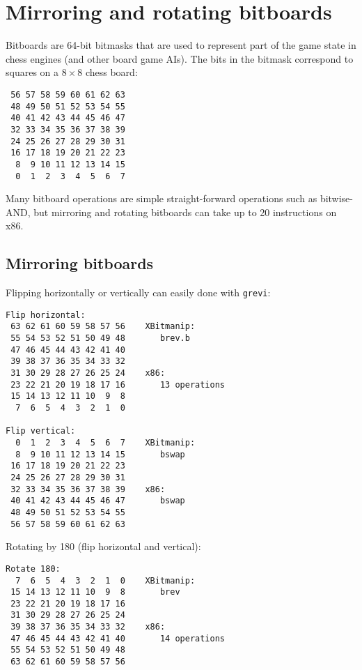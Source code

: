\section{Mirroring and rotating bitboards}

Bitboards are 64-bit bitmasks that are used to represent part of the game state
in chess engines (and other board game AIs). The bits in the bitmask correspond
to squares on a $8 \times 8$ chess board:

\begin{verbatim}
 56 57 58 59 60 61 62 63
 48 49 50 51 52 53 54 55
 40 41 42 43 44 45 46 47
 32 33 34 35 36 37 38 39
 24 25 26 27 28 29 30 31
 16 17 18 19 20 21 22 23
  8  9 10 11 12 13 14 15
  0  1  2  3  4  5  6  7
\end{verbatim}

Many bitboard operations are simple straight-forward operations such as
bitwise-AND, but mirroring and rotating bitboards can take up to 20
instructions on x86.

\subsection{Mirroring bitboards}

Flipping horizontally or vertically can easily done with {\tt grevi}:

\begin{verbatim}
Flip horizontal:
 63 62 61 60 59 58 57 56    XBitmanip:
 55 54 53 52 51 50 49 48       brev.b
 47 46 45 44 43 42 41 40
 39 38 37 36 35 34 33 32
 31 30 29 28 27 26 25 24    x86:
 23 22 21 20 19 18 17 16       13 operations
 15 14 13 12 11 10  9  8
  7  6  5  4  3  2  1  0

Flip vertical:
  0  1  2  3  4  5  6  7    XBitmanip:
  8  9 10 11 12 13 14 15       bswap
 16 17 18 19 20 21 22 23
 24 25 26 27 28 29 30 31
 32 33 34 35 36 37 38 39    x86:
 40 41 42 43 44 45 46 47       bswap
 48 49 50 51 52 53 54 55
 56 57 58 59 60 61 62 63
\end{verbatim}

Rotating by 180 (flip horizontal and vertical):

\begin{verbatim}
Rotate 180:
  7  6  5  4  3  2  1  0    XBitmanip:
 15 14 13 12 11 10  9  8       brev
 23 22 21 20 19 18 17 16
 31 30 29 28 27 26 25 24
 39 38 37 36 35 34 33 32    x86:
 47 46 45 44 43 42 41 40       14 operations
 55 54 53 52 51 50 49 48
 63 62 61 60 59 58 57 56
\end{verbatim}

